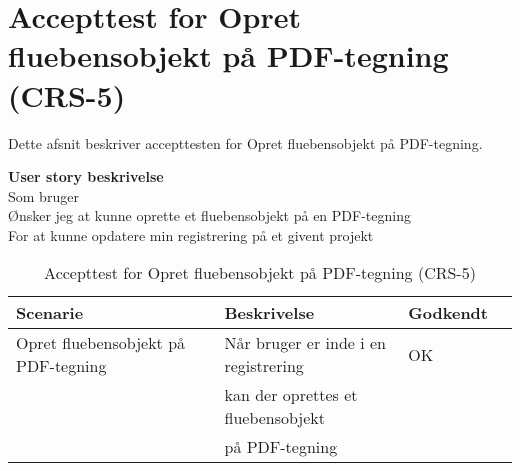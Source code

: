 \section{Accepttest for Opret fluebensobjekt på PDF-tegning (CRS-5)}
Dette afsnit beskriver accepttesten for Opret fluebensobjekt på PDF-tegning.

\textbf{User story beskrivelse} \\
Som bruger \\
Ønsker jeg at kunne oprette et fluebensobjekt på en PDF-tegning \\
For at kunne opdatere min registrering på et givent projekt

\begin{table}[H]
	\centering
	\begin{tabular}{|ll|l|ll|} \hline
		\textbf{Scenarie} &  & \textbf{Beskrivelse}&  \textbf{Godkendt}&  \\ \hline
		Opret fluebensobjekt på PDF-tegning&  &  Når bruger er inde i en registrering &  OK&  \\
		& & kan der oprettes et fluebensobjekt& & \\ 
		& & på PDF-tegning& & \\ \hline
	\end{tabular}
	\caption{Accepttest for Opret fluebensobjekt på PDF-tegning (CRS-5)}
	\label{AcceptFlueben}
\end{table}